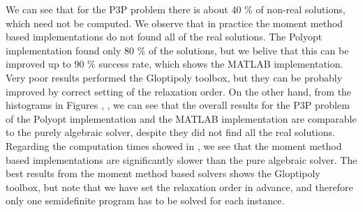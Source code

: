 We can see that for the P3P problem there is about $40$ \% of non-real solutions, which need not be computed.
We observe that in practice the moment method based implementations do not found all of the real solutions.
The Polyopt implementation found only $80$ \% of the solutions, but we belive that this can be improved up to $90$ \% success rate, which shows the MATLAB implementation.
Very poor results performed the Gloptipoly toolbox, but they can be probably improved by correct setting of the relaxation order.
On the other hand, from the histograms in Figures , ,  we can see that the overall results for the P3P problem of the Polyopt implementation and the MATLAB implementation are comparable to the purely algebraic solver, despite they did not find all the real solutions.
Regarding the computation times showed in , we see that the moment method based implementations are significantly slower than the  pure algebraic solver.
The best results from the moment method based solvers shows the Gloptipoly \cite{gloptipoly} toolbox, but note that we have set the relaxation order in advance, and therefore only one semidefinite program has to be solved for each instance.
